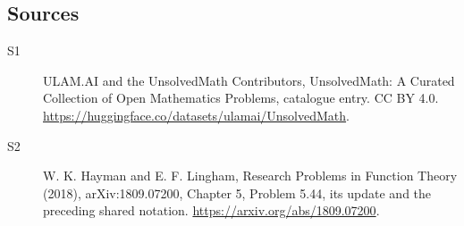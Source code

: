 \documentclass[11pt]{article}
\begin{document}
\subsection{Sources}
\begin{description}
\item[\hypertarget{source:statement:1}{S1}] ULAM.AI and the UnsolvedMath Contributors, UnsolvedMath: A Curated Collection of Open Mathematics Problems, catalogue entry. CC BY 4.0. \url{https://huggingface.co/datasets/ulamai/UnsolvedMath}.
\item[\hypertarget{source:statement:2}{S2}] W. K. Hayman and E. F. Lingham, Research Problems in Function Theory (2018), arXiv:1809.07200, Chapter 5, Problem 5.44, its update and the preceding shared notation. \url{https://arxiv.org/abs/1809.07200}.
\end{description}
\label{end:statement}
\end{document}
